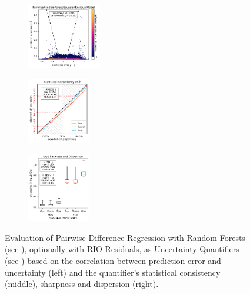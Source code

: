 \begin{figure}[H]
    \begin{subfigure}
    \centering
    \includegraphics[width=0.348\textwidth,valign=t]{uncertainty/figures/uq.pairwiserandomforestgaussianresidualmodel-correlation.pdf}
    \end{subfigure}
    \begin{subfigure}
    \centering
    \includegraphics[width=0.299\textwidth,valign=t]{uncertainty/figures/uq.pairwiserandomforestgaussianresidualmodel-consistency.pdf}
    \end{subfigure}
    \begin{subfigure}
    \centering
    \includegraphics[width=0.303\textwidth,valign=t]{uncertainty/figures/uq.pairwiserandomforestgaussianresidualmodel-sharpness.pdf}
    \end{subfigure}
   
    \vspace{-1em}
    \caption[Evaluation of PADRE-RF as an Uncertainty Quantifier]{Evaluation of Pairwise Difference Regression with Random Forests (see ), optionally with RIO Residuals, as Uncertainty Quantifiers (see ) based on the correlation between prediction error and uncertainty (left) and the quantifier's statistical consistency (middle), sharpness and dispersion (right).}
    \label{fig:uncertainty-padre-residual}
\end{figure}

